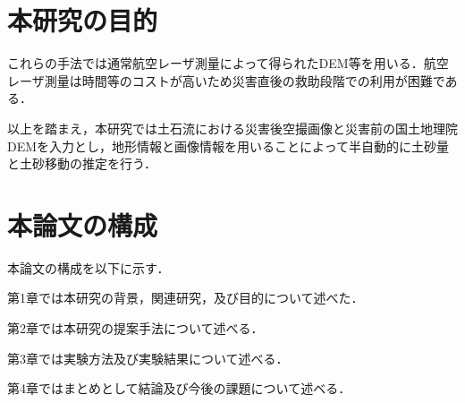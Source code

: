   \section{本研究の目的}
    これらの手法では通常航空レーザ測量によって得られたDEM等を用いる．航空レーザ測量は時間等のコストが高いため災害直後の救助段階での利用が困難である．

    以上を踏まえ，本研究では土石流における災害後空撮画像と災害前の国土地理院DEM\cite{基盤地図情報}を入力とし，地形情報と画像情報を用いることによって半自動的に土砂量と土砂移動の推定を行う．


  \section{本論文の構成}
    本論文の構成を以下に示す．
    
    第1章では本研究の背景，関連研究，及び目的について述べた．

    第2章では本研究の提案手法について述べる．

    第3章では実験方法及び実験結果について述べる．

    第4章ではまとめとして結論及び今後の課題について述べる．
